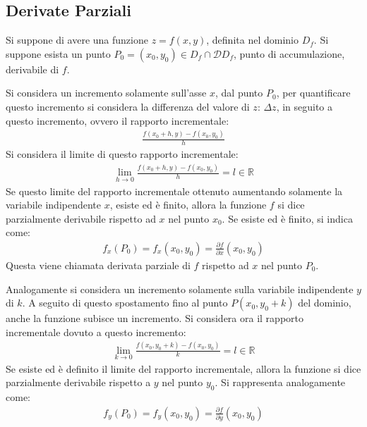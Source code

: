 \documentclass{article}
\numberwithin{equation}{subsection}
\begin{document}
\subsection{Derivate Parziali}

Si suppone di avere una funzione $z=f(x,y)$, definita nel dominio $D_f$. Si suppone esista un punto $P_0=(x_0,y_0)\in D_f\cap\mathscr{D}D_f$, punto di accumulazione, derivabile di $f$. %


Si considera un incremento solamente sull'asse $x$, dal punto $P_0$, per quantificare questo incremento si considera la differenza del valore di $z$: $\Delta z$, in seguito a questo incremento, ovvero il rapporto incrementale:
\begin{gather*}
    \displaystyle\frac{f(x_0+h,y)-f(x_0,y_0)}{h}
\end{gather*}
Si considera il limite di questo rapporto incrementale:
\begin{gather*}
    \lim_{h\to0}\displaystyle\frac{f(x_0+h,y)-f(x_0,y_0)}{h}=l\in\mathbb{R}
\end{gather*}
Se questo limite del rapporto incrementale ottenuto aumentando solamente la variabile indipendente $x$, esiste ed è finito, allora la funzione $f$ si dice parzialmente derivabile rispetto ad $x$ nel punto $x_0$. Se esiste ed è finito, si indica come:
\begin{gather*}
    f_x(P_0)=f_x(x_0,y_0)=\displaystyle\frac{\partial f}{\partial x}(x_0,y_0)
\end{gather*}
Questa viene chiamata derivata parziale di $f$ rispetto ad $x$ nel punto $P_0$. 

Analogamente si considera un incremento solamente sulla variabile indipendente $y$ di $k$. A seguito di questo spostamento fino al punto $P(x_0,y_0+k)$ del dominio, anche la funzione subisce un incremento. Si considera ora il rapporto incrementale dovuto a questo incremento:
\begin{gather*}
    \lim_{k\to0}\displaystyle\frac{f(x_0,y_0+k)-f(x_0,y_0)}{k}=l\in\mathbb{R}
\end{gather*}
Se esiste ed è definito il limite del rapporto incrementale, allora la funzione si dice parzialmente derivabile rispetto a $y$ nel punto $y_0$. Si rappresenta analogamente come:
\begin{gather*}
    f_y(P_0)=f_y(x_0,y_0)=\displaystyle\frac{\partial f}{\partial y}(x_0,y_0)
\end{gather*}
\end{document}

